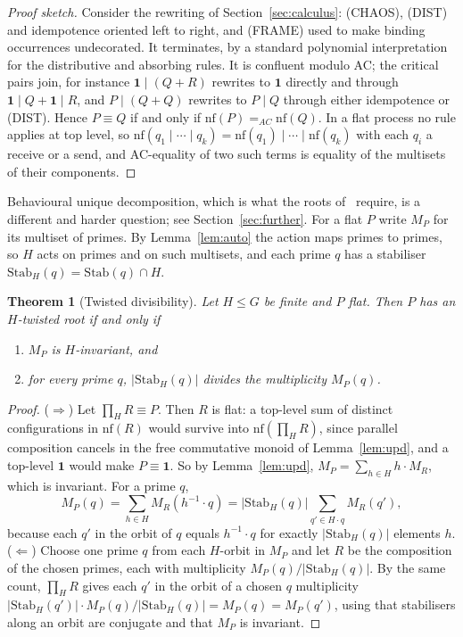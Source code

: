 \documentclass[11pt]{article}
\newtheorem{theorem}{Theorem}[section]
\theoremstyle{definition}
\theoremstyle{remark}
\newcommand{\chaos}{\mathbf{1}}
\newcommand{\act}[2]{#1\cdot #2}
\newcommand{\scong}{\equiv}
\newcommand{\Stab}{\mathrm{Stab}}
\newcommand{\nf}{\mathrm{nf}}
\begin{document}
\begin{proof}[Proof sketch]
Consider the rewriting of Section~\ref{sec:calculus}: (CHAOS), (DIST) and
idempotence oriented left to right, and (FRAME) used to make binding
occurrences undecorated. It terminates, by a standard polynomial
interpretation for the distributive and absorbing rules. It is confluent
modulo AC; the critical pairs join, for instance
$\chaos\mid(Q+R)$ rewrites to $\chaos$ directly and through
$\chaos\mid Q+\chaos\mid R$, and $P\mid(Q+Q)$ rewrites to $P\mid Q$ through
either idempotence or (DIST). Hence $P\scong Q$ if and only if
$\nf(P)=_{AC}\nf(Q)$. In a flat process no rule applies at top level, so
$\nf(q_1\mid\cdots\mid q_k)=\nf(q_1)\mid\cdots\mid\nf(q_k)$ with each $q_i$ a
receive or a send, and AC-equality of two such terms is equality of the
multisets of their components.
\end{proof}

Behavioural unique decomposition, which is what the roots of~\cite{rft}
require, is a different and harder question; see
Section~\ref{sec:further}. For a flat $P$ write $M_P$ for its multiset of
primes. By Lemma~\ref{lem:auto} the action maps primes to
primes, so $H$ acts on primes and on such multisets, and each prime $q$ has a
stabiliser $\Stab_H(q)=\Stab(q)\cap H$.

\begin{theorem}[Twisted divisibility]\label{thm:twisted}
Let $H\le G$ be finite and $P$ flat. Then $P$ has an $H$-twisted root if and
only if
\begin{enumerate}[label=(\alph*)]
\item $M_P$ is $H$-invariant, and
\item for every prime $q$, $|\Stab_H(q)|$ divides the multiplicity $M_P(q)$.
\end{enumerate}
\end{theorem}

\begin{proof}
($\Rightarrow$) Let $\prod_H R\scong P$. Then $R$ is flat: a top-level sum
of distinct configurations in $\nf(R)$ would survive into $\nf(\prod_H R)$,
since parallel composition cancels in the free commutative monoid of
Lemma~\ref{lem:upd}, and a top-level $\chaos$ would make $P\scong\chaos$. So
by Lemma~\ref{lem:upd},
$M_P=\sum_{h\in H}\act{h}{M_R}$, which is invariant. For a prime $q$,
\[
M_P(q)=\sum_{h\in H}M_R(\act{h^{-1}}{q})
=|\Stab_H(q)|\sum_{q'\in H\cdot q}M_R(q'),
\]
because each $q'$ in the orbit of $q$ equals $\act{h^{-1}}{q}$ for exactly
$|\Stab_H(q)|$ elements $h$.
($\Leftarrow$) Choose one prime $q$ from each $H$-orbit in $M_P$ and let $R$
be the composition of the chosen primes, each with multiplicity
$M_P(q)/|\Stab_H(q)|$. By the same count, $\prod_H R$ gives each $q'$ in the
orbit of a chosen $q$ multiplicity
$|\Stab_H(q')|\cdot M_P(q)/|\Stab_H(q)|=M_P(q)=M_P(q')$, using that stabilisers
along an orbit are conjugate and that $M_P$ is invariant.
\end{proof}
\end{document}
